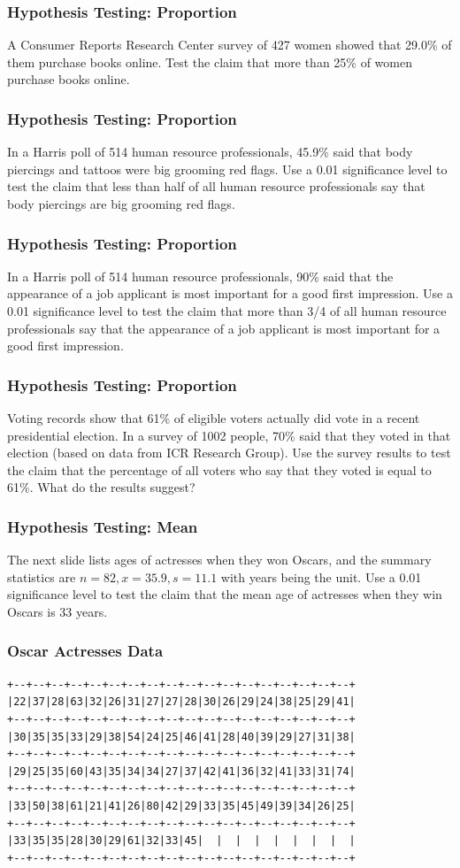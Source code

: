 \documentclass[xcolor=dvipsnames]{beamer}
\begin{document}
\begin{frame}
  \frametitle{Hypothesis Testing: Proportion}
  {\ubung} A Consumer Reports Research Center survey of 427 women
  showed that 29.0\% of them purchase books online. Test the
  claim that more than 25\% of women purchase books online.
\end{frame}

\begin{frame}
  \frametitle{Hypothesis Testing: Proportion}
  {\ubung} In a Harris poll of 514 human resource professionals,
  45.9\% said that body piercings and tattoos were big
  grooming red flags. Use a 0.01 significance level to test the claim
  that less than half of all human resource professionals say that
  body piercings are big grooming red flags.
\end{frame}

\begin{frame}
  \frametitle{Hypothesis Testing: Proportion}
  {\ubung} In a Harris poll of 514 human resource professionals, 90\%
  said that the appearance of a job applicant is most important for a
  good first impression. Use a 0.01 significance level to test the
  claim that more than 3/4 of all human resource professionals say
  that the appearance of a job applicant is most important for a good
  first impression.
\end{frame}

\begin{frame}
  \frametitle{Hypothesis Testing: Proportion}
  {\ubung} Voting records show that 61\% of eligible voters actually
  did vote in a recent presidential election. In a survey of 1002
  people, 70\% said that they voted in that election (based on data
  from ICR Research Group). Use the survey results to test the claim
  that the percentage of all voters who say that they voted is equal
  to 61\%. What do the results suggest?
\end{frame}

\begin{frame}
  \frametitle{Hypothesis Testing: Mean}
  {\ubung} The next slide lists ages of actresses when
  they won Oscars, and the summary statistics are
  $n=82,x=35.9,s=11.1$ with years being the unit. Use a
  0.01 significance level to test the claim that the
  mean age of actresses when they win Oscars is 33
  years.
\end{frame}

\begin{frame}[fragile]
  \frametitle{Oscar Actresses Data}
\begin{verbatim}
+--+--+--+--+--+--+--+--+--+--+--+--+--+--+--+--+--+--+
|22|37|28|63|32|26|31|27|27|28|30|26|29|24|38|25|29|41|
+--+--+--+--+--+--+--+--+--+--+--+--+--+--+--+--+--+--+
|30|35|35|33|29|38|54|24|25|46|41|28|40|39|29|27|31|38|
+--+--+--+--+--+--+--+--+--+--+--+--+--+--+--+--+--+--+
|29|25|35|60|43|35|34|34|27|37|42|41|36|32|41|33|31|74|
+--+--+--+--+--+--+--+--+--+--+--+--+--+--+--+--+--+--+
|33|50|38|61|21|41|26|80|42|29|33|35|45|49|39|34|26|25|
+--+--+--+--+--+--+--+--+--+--+--+--+--+--+--+--+--+--+
|33|35|35|28|30|29|61|32|33|45|  |  |  |  |  |  |  |  |
+--+--+--+--+--+--+--+--+--+--+--+--+--+--+--+--+--+--+
\end{verbatim}
\end{frame}
\end{document}
